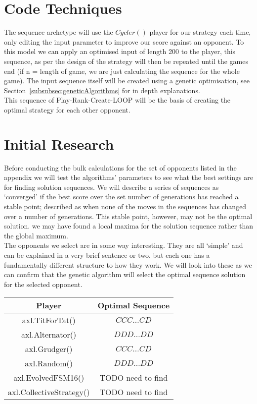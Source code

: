 \section{Code Techniques}\label{sec:codeTechniques}
The sequence archetype will use the \(Cycler()\) player for our strategy each time, only editing the input parameter to improve our score against an opponent.
To this model we can apply an optimised input of length 200 to the player, this sequence, as per the design of the strategy will then be repeated until the games end (if n = length of game, we are just calculating the sequence for the whole game).
The input sequence itself will be created using a genetic optimisation, see Section~\ref{subsubsec:geneticAlgorithms} for in depth
explanations.\\

This sequence of Play-Rank-Create-LOOP will be the basis of creating the optimal strategy for each other opponent.

\section{Initial Research}\label{sec:initialResearch}
Before conducting the bulk calculations for the set of opponents listed in the appendix we will test the algorithms' parameters to see what the best settings are for finding solution sequences.
We will describe a series of sequences as `converged' if the best score over the set number of generations has reached a stable point;
described as when none of the moves in the sequences has changed over a number of generations.
This stable point, however, may not be the optimal solution.
we may have found a local maxima for the solution sequence rather than the global maximum. \\

The opponents we select are in some way interesting.
They are all `simple' and can be explained in a very brief sentence or two, but each one has a fundamentally different structure to how they work.
We will look into these as we can confirm that the genetic algorithm will select the optimal sequence solution for the selected opponent. \\

\begin{center}
    \begin{tabular}{cc}
        \toprule
        Player & Optimal Sequence \\
        \midrule
        axl.TitForTat()&\(CCC\ldots CD\)\\
        axl.Alternator()&\(DDD\ldots DD\)\\
        axl.Grudger()&\(CCC\ldots CD\)\\
        axl.Random()&\(DDD\ldots DD\)\\
        axl.EvolvedFSM16()&TODO need to find\\
        axl.CollectiveStrategy()&TODO need to find\\
        \bottomrule
    \end{tabular}
\end{center}

